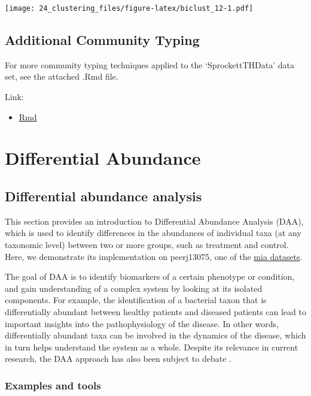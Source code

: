 \documentclass[
]{book}
\providecommand{\tightlist}{%
  \setlength{\itemsep}{0pt}\setlength{\parskip}{0pt}}
\begin{document}
\texttt{[image: 24\_clustering\_files/figure-latex/biclust\_12-1.pdf]}

\hypertarget{additional-community-typing}{%
\section{Additional Community Typing}\label{additional-community-typing}}

For more community typing techniques applied to the `SprockettTHData'
data set, see the attached .Rmd file.

Link:

\begin{itemize}
\tightlist
\item
  \href{add-comm-typing.Rmd}{Rmd}
\end{itemize}

\hypertarget{differential-abundance}{%
\chapter{Differential Abundance}\label{differential-abundance}}

\hypertarget{differential-abundance-analysis}{%
\section{Differential abundance analysis}\label{differential-abundance-analysis}}

This section provides an introduction to Differential Abundance Analysis (DAA),
which is used to identify differences in the abundances of individual taxa (at
any taxonomic level) between two or more groups, such as treatment and control.
Here, we demonstrate its implementation on peerj13075, one of the \protect\hyperlink{package-data}{mia datasets}.

The goal of DAA is to identify biomarkers of a certain phenotype or condition,
and gain understanding of a complex system by looking at its isolated components.
For example, the identification of a bacterial taxon that is differentially
abundant between healthy patients and diseased patients can lead to important
insights into the pathophysiology of the disease. In other words, differentially
abundant taxa can be involved in the dynamics of the disease, which in turn helps
understand the system as a whole. Despite its relevance in current research,
the DAA approach has also been subject to debate \citep{Quinn2021}.

\hypertarget{examples-and-tools}{%
\subsection{Examples and tools}\label{examples-and-tools}}
\end{document}

